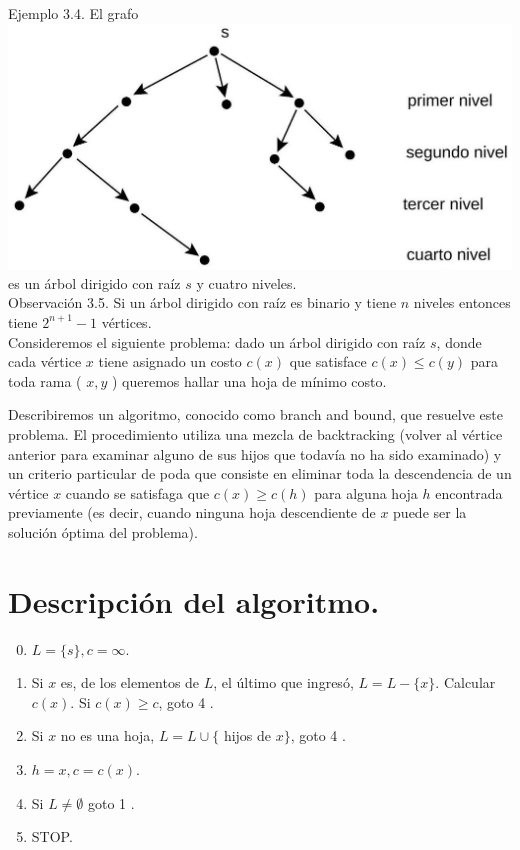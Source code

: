 \documentclass[10pt]{article}
\begin{document}
Ejemplo 3.4. El grafo\\
\includegraphics[max width=\textwidth, center]{2025_09_05_458e5b1ce89abceb5d44g-15}\\
es un árbol dirigido con raíz $s$ y cuatro niveles.\\
Observación 3.5. Si un árbol dirigido con raíz es binario y tiene $n$ niveles entonces tiene $2^{n+1}-1$ vértices.\\
Consideremos el siguiente problema: dado un árbol dirigido con raíz $s$, donde cada vértice $x$ tiene asignado un costo $c(x)$ que satisface $c(x) \leq c(y)$ para toda rama ( $x, y$ ) queremos hallar una hoja de mínimo costo.

Describiremos un algoritmo, conocido como branch and bound, que resuelve este problema. El procedimiento utiliza una mezcla de backtracking (volver al vértice anterior para examinar alguno de sus hijos que todavía no ha sido examinado) y un criterio particular de poda que consiste en eliminar toda la descendencia de un vértice $x$ cuando se satisfaga que $c(x) \geq c(h)$ para alguna hoja $h$ encontrada previamente (es decir, cuando ninguna hoja descendiente de $x$ puede ser la solución óptima del problema).

\section*{Descripción del algoritmo.}
\begin{enumerate}
  \setcounter{enumi}{-1}
  \item $L=\{s\}, c=\infty$.
  \item Si $x$ es, de los elementos de $L$, el último que ingresó, $L=L-\{x\}$. Calcular $c(x)$. Si $c(x) \geq c$, goto 4 .
  \item Si $x$ no es una hoja, $L=L \cup\{$ hijos de $x\}$, goto 4 .
  \item $h=x, c=c(x)$.
  \item Si $L \neq \emptyset$ goto 1 .
  \item STOP.
\end{enumerate}
\end{document}

